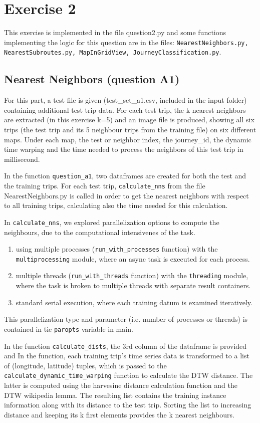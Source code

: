 \documentclass[12pt]{article}
\begin{document}
	\section{Exercise 2}
	This exercise is implemented in the file question2.py and some functions implementing the logic for this question are in the files: \texttt{NearestNeighbors.py, NearestSubroutes.py, MapInGridView, JourneyClassification.py}.
	
	\subsection{Nearest Neighbors (question A1)}
	For this part, a test file is given (test\_set\_a1.csv, included in the input
  folder) containing additional test trip data. For each test trip, the k
  nearest neighbors are extracted (in this exercise k=5) and an image file is
  produced, showing all six trips (the test trip and its 5 neighbour trips from the training file) on six different maps. Under each map, the test or neighbor index, the journey\_id, the dynamic time warping and the time needed to process the neighbors of this test trip in millisecond.
	
	In the function \texttt{question\_a1}, two dataframes are created for both the
  test and the training trips. For each test trip, \texttt{calculate\_nns} from
  the file NearestNeighbors.py is called in order to get the nearest neighbors
  with respect to all training trips, calculating also the time needed for this calculation.
	
	In \texttt{calculate\_nns}, we explored parallelization options to compute the neighbours,
  due to the computational intensivenes of the task.
  \begin{enumerate}
  \item using multiple processes (\texttt{run\_with\_processes} function) with the
    \texttt{multiprocessing} module, where an async task is executed for each process.
  \item multiple threads (\texttt{run\_with\_threads} function) with the \texttt{threading} module, where the task is
    broken to multiple threads with separate result containers.
  \item standard serial execution, where each training datum is examined iteratively.
  \end{enumerate}
  This parallelization type and parameter (i.e. number of processes or threads) is contained in tie \texttt{paropts} variable in main.
	
	In the function \texttt{calculate\_dists}, the 3rd column of the dataframe is
  provided and
  In the function, each training trip's time series data is transformed to a
  list of (longitude, latitude) tuples, which is passed to the \texttt{calculate\_dynamic\_time\_warping}
  function to calculate the DTW distance. The latter is computed using the
  harvesine distance calculation function and the DTW wikipedia lemma. The
  resulting list contains the training instance information along with its distance to
  the test trip. Sorting the list to increasing distance and keeping its k first
  elements provides the k nearest neighbours.
	
\end{document}
